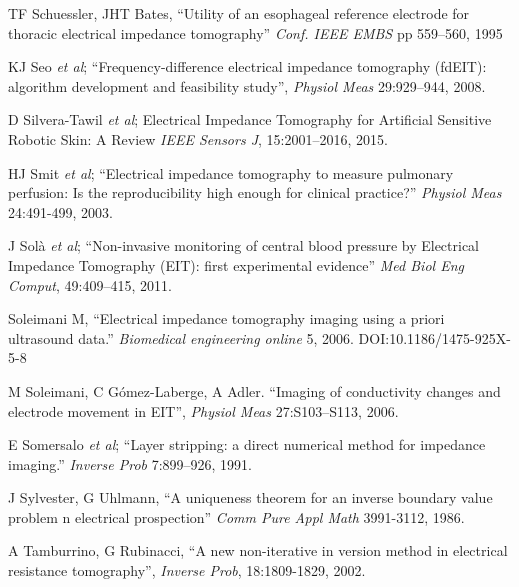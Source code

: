 \documentclass[10pt,journal]{IEEEtran}\def\TBLWIDA{15mm}\def\TBLWIDB{60mm}
\newcommand{\ifmaxthree}[2]{#2 {\em et al}; }
\begin{document}
\begin{thebibliography}{00}
TF Schuessler, JHT Bates, 
``Utility of an esophageal reference electrode for thoracic electrical impedance tomography''
{\em Conf. IEEE EMBS} pp 559--560, 1995

\ifmaxthree{
JK Seo, J Lee, SW Kim, H Zribi, EJe Woo;
}{
KJ Seo
}
``Frequency-difference electrical impedance tomography (fdEIT): algorithm development and feasibility study'',
{\em  Physiol Meas} 29:929--944, 2008.


\ifmaxthree{
David Silvera-Tawil ; David Rye ; Manuchehr Soleimani ; Mari Velonaki
}{
D Silvera-Tawil
}
Electrical Impedance Tomography for Artificial Sensitive Robotic Skin: A Review
{\em IEEE Sensors J}, 15:2001--2016, 2015.

\ifmaxthree{
HJ Smit, ML Handoko, A Vonk Noordegraaf, TJ Faes, PE Postmus, PM de Vries, A Boonstra
}{
HJ Smit
}
``Electrical impedance tomography to measure pulmonary perfusion: Is the
reproducibility high enough for clinical practice?''
{\em Physiol Meas} 24:491-499, 2003.

\ifmaxthree{
J Solà, A Adler, A Santos, G Tusman, FS Sipmann, SH Böhm,
}{
J Solà
}
``Non-invasive monitoring of central blood pressure by Electrical Impedance
Tomography (EIT): first experimental evidence''
{\em Med Biol Eng Comput}, 49:409--415, 2011.

Soleimani M, ``Electrical impedance tomography imaging using a priori ultrasound data.''
{\em Biomedical engineering online} 5, 2006. %
DOI:10.1186/1475-925X-5-8

M Soleimani, C Gómez-Laberge, A Adler.
``Imaging of conductivity changes and electrode movement in EIT'',
{\em Physiol Meas} 27:S103--S113, 2006.

\ifmaxthree{
E Somersalo, M Cheney, D Isaacson, E Isaacson. 
}{
E Somersalo
}
``Layer stripping: a direct numerical method for impedance imaging.''
{\em Inverse Prob} 7:899--926, 1991.

J Sylvester, G Uhlmann,
``A uniqueness theorem for an inverse
boundary value problem n electrical prospection''
{\em Comm Pure Appl Math} 3991-3112, 1986.

A Tamburrino, G Rubinacci,
``A new non-iterative in version method in electrical resistance tomography'',
{\em Inverse Prob}, 18:1809-1829, 2002.


\end{thebibliography}
\end{document}
